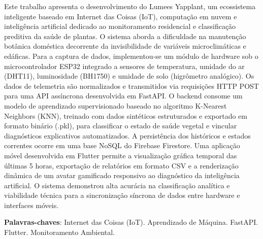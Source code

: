 \documentclass[
	12pt,
	article,
	oneside,
	a4paper,
	english,
	brazil
	]{abntex2}
\begin{document}
\frenchspacing 


\maketitle
\begin{resumoumacoluna}
Este trabalho apresenta o desenvolvimento do Lumees Yapplant, um ecossistema inteligente baseado em Internet das Coisas (IoT), computação em nuvem e inteligência artificial dedicado ao monitoramento residencial e classificação preditiva da saúde de plantas. O sistema aborda a dificuldade na manutenção botânica doméstica decorrente da invisibilidade de variáveis microclimáticas e edáficas. Para a captura de dados, implementou-se um módulo de hardware sob o microcontrolador ESP32 integrado a sensores de temperatura, umidade do ar (DHT11), luminosidade (BH1750) e umidade de solo (higrômetro analógico). Os dados de telemetria são normalizados e transmitidos via requisições HTTP POST para uma API assíncrona desenvolvida em FastAPI. O backend consome um modelo de aprendizado supervisionado baseado no algoritmo K-Nearest Neighbors (KNN), treinado com dados sintéticos estruturados e exportado em formato binário (.pkl), para classificar o estado de saúde vegetal e vincular diagnósticos explicativos automatizados. A persistência dos históricos e estados correntes ocorre em uma base NoSQL do Firebase Firestore. Uma aplicação móvel desenvolvida em Flutter permite a visualização gráfica temporal das últimas 5 horas, exportação de relatórios em formato CSV e a renderização dinâmica de um avatar gamificado responsivo ao diagnóstico da inteligência artificial. O sistema demonstrou alta acurácia na classificação analítica e viabilidade técnica para a sincronização síncrona de dados entre hardware e interfaces móveis.
 
 \vspace{\onelineskip}
 
 \noindent
 \textbf{Palavras-chaves}: Internet das Coisas (IoT). Aprendizado de Máquina. FastAPI. Flutter. Monitoramento Ambiental.
\end{resumoumacoluna}
\end{document}
